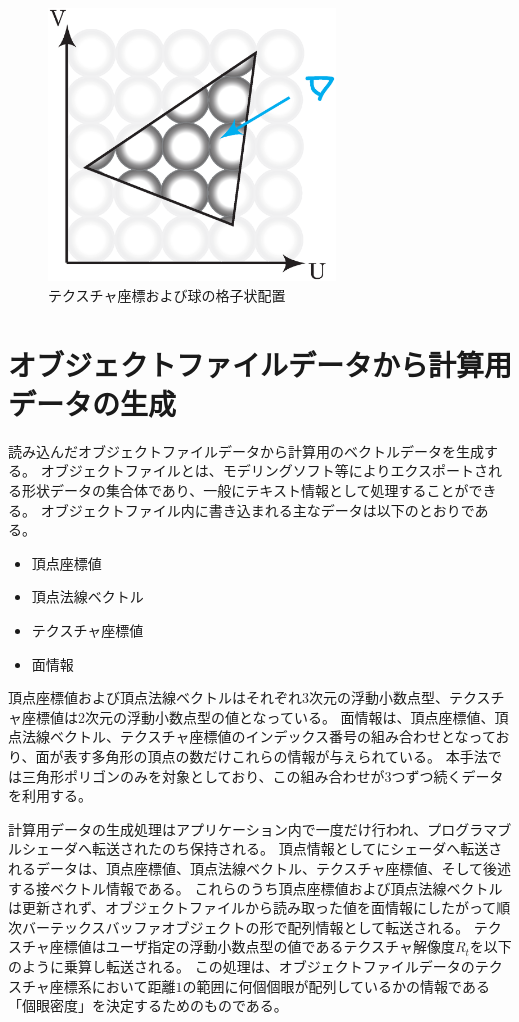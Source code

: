 \begin{figure}[h]
  \centering
  \includegraphics[width=3.0in]{./img/sphere_position.eps}
  \caption{テクスチャ座標および球の格子状配置}
  \label{FGrid}
\end{figure}

\section{オブジェクトファイルデータから計算用データの生成}
\label{SCalcData}

読み込んだオブジェクトファイルデータから計算用のベクトルデータを生成する。
オブジェクトファイルとは、モデリングソフト等によりエクスポートされる形状データの集合体であり、一般にテキスト情報として処理することができる。
オブジェクトファイル内に書き込まれる主なデータは以下のとおりである。
\begin{itemize}
\item 頂点座標値
\item 頂点法線ベクトル
\item テクスチャ座標値
\item 面情報
\end{itemize}
頂点座標値および頂点法線ベクトルはそれぞれ3次元の浮動小数点型、テクスチャ座標値は2次元の浮動小数点型の値となっている。
面情報は、頂点座標値、頂点法線ベクトル、テクスチャ座標値のインデックス番号の組み合わせとなっており、面が表す多角形の頂点の数だけこれらの情報が与えられている。
本手法では三角形ポリゴンのみを対象としており、この組み合わせが3つずつ続くデータを利用する。

計算用データの生成処理はアプリケーション内で一度だけ行われ、プログラマブルシェーダへ転送されたのち保持される。
頂点情報としてにシェーダへ転送されるデータは、頂点座標値、頂点法線ベクトル、テクスチャ座標値、そして後述する接ベクトル情報である。
これらのうち頂点座標値および頂点法線ベクトルは更新されず、オブジェクトファイルから読み取った値を面情報にしたがって順次バーテックスバッファオブジェクトの形で配列情報として転送される。
テクスチャ座標値はユーザ指定の浮動小数点型の値であるテクスチャ解像度$R_t$を以下のように乗算し転送される。
この処理は、オブジェクトファイルデータのテクスチャ座標系において距離$1$の範囲に何個個眼が配列しているかの情報である「個眼密度」を決定するためのものである。

